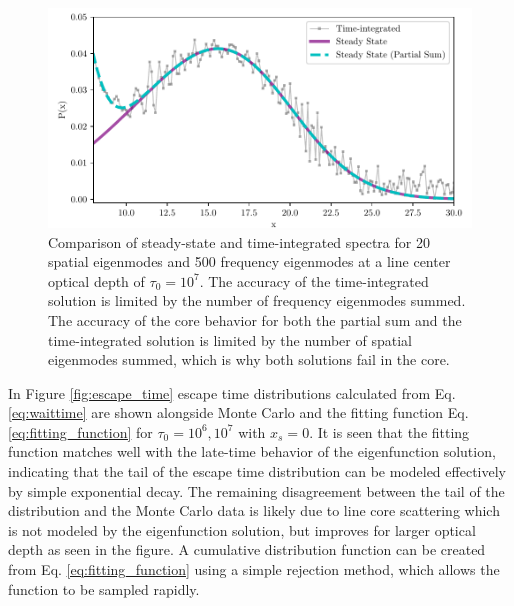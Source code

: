 \documentclass{aastex63}
\begin{document}
\begin{figure}
    \centering
    \includegraphics{steadystate.pdf}
    \caption{Comparison of steady-state and time-integrated spectra for 20 spatial eigenmodes and 500 frequency eigenmodes at a line center optical depth of $\tau_0=10^7$. The accuracy of the time-integrated solution is limited by the number of frequency eigenmodes summed. The accuracy of the core behavior for both the partial sum and the time-integrated solution is limited by the number of spatial eigenmodes summed, which is why both solutions fail in the core.}
    \label{fig:steadystate}
\end{figure}


In Figure \ref{fig:escape_time} escape time distributions calculated from Eq. \ref{eq:waittime} are shown alongside Monte Carlo and the fitting function Eq. \ref{eq:fitting_function} for $\tau_0=10^6, 10^7$ with $x_s=0$. It is seen that the fitting function matches well with the late-time behavior of the eigenfunction solution, indicating that the tail of the escape time distribution can be modeled effectively by simple exponential decay. The remaining disagreement between the tail of the distribution and the Monte Carlo data is likely due to line core scattering which is not modeled by the eigenfunction solution, but improves for larger optical depth as seen in the figure. A cumulative distribution function can be created from Eq. \ref{eq:fitting_function} using a simple rejection method, which allows the function to be sampled rapidly.
\end{document}

